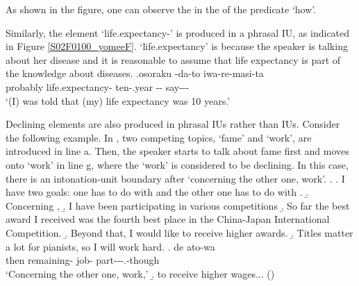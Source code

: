 As shown in the figure,
one can observe the  in the  of the predicate  `how'.

Similarly,
the  element  `life.expectancy-' is produced in a phrasal IU, as indicated in Figure \ref{S02F0100_yomeeF}.
 `life.expectancy' is 
because the speaker is talking about her disease and
it is reasonable to assume that life expectancy is part of the knowledge about diseases.
%
\exg.\label{S02F0100_yomee}osoraku {\iub}  {\iub}  {\iub} -da-to {\iub} iwa-re-masi-ta \\
      probably {} life.expectancy- {} ten-.year {} -- {} say--- \\
      `(I) was told that (my) life expectancy was 10 years.'


Declining elements are also produced in phrasal IUs rather than  IUs.
Consider the following example.
In \Next,
two competing topics,  `fame' and  `work',
are introduced in line a.
Then, the speaker starts to talk about fame first and moves onto `work' in line g,
where the   `work' is considered to be declining.
In this case, there is an intonation-unit boundary after  `concerning the other one, work'.
%
\ex.
 \a.
 I have two goals: one has to do with  and the other one has to do with .
 \b. Concerning ,
 \b. I have been participating in various  competitions
 \b. So far the best award I received was the fourth best place in the China-Japan International Competition.
 \b. Beyond that, I would like to receive higher awards.
 \b. Titles matter a lot for pianists, so I will work hard.
 \bg. de {\iub} ato-wa {\iub}  {\iub}  {\iub} \\
 	then {} remaining- {} job- {} part---.-though {} \\
	`Concerning the other one, work,'
 \b. to receive higher wages...
\hfill{()}




